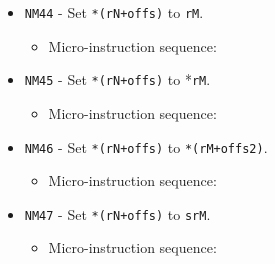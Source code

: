 \documentclass{article}
\def\specialtodata#1{\Verb|#1002| - output \Verb|sr#1| to data bus}
\def\pkptrout{\Verb|0202| - output *\Verb|pk| to data bus}
\def\datatooffs{\Verb|4402| - write to \Verb|offs| from data bus}
\def\incrementpk{\Verb|0502| - increment \Verb|pk|}
\def\regtodata#1{\Verb|#1003| - output \Verb|r#1| to data bus}
\def\regtoaddr#1{\Verb|#1103| - output \Verb|r#1| to addr bus}
\def\regptodatao#1{\Verb|#1303| - output *(\Verb|r#1|+\Verb|offs|) to data bus}
\def\writeRAM{\Verb|0004| - write data bus to *(addr bus)}
\def\echodatalong{\Verb|0025| - echo data bus to itself for 3 cycles}
\def\done{\Verb|fffe| - end instruction}
\begin{document}
\begin{itemize}
    \item \Verb|NM44| - Set \Verb|*(rN+offs)| to \Verb|rM|.
    \begin{itemize}
        \item Micro-instruction sequence:
    \end{itemize}

    \item \Verb|NM45| - Set \Verb|*(rN+offs)| to *\Verb|rM|.
    \begin{itemize}
        \item Micro-instruction sequence:
    \end{itemize}

    \item \Verb|NM46| - Set \Verb|*(rN+offs)| to \Verb|*(rM+offs2)|.
    \begin{itemize}
        \item Micro-instruction sequence:
    \end{itemize}
    
    \item \Verb|NM47| - Set \Verb|*(rN+offs)| to \Verb|srM|.
    \begin{itemize}
        \item Micro-instruction sequence:
    \end{itemize}


\end{itemize}
\end{document}
